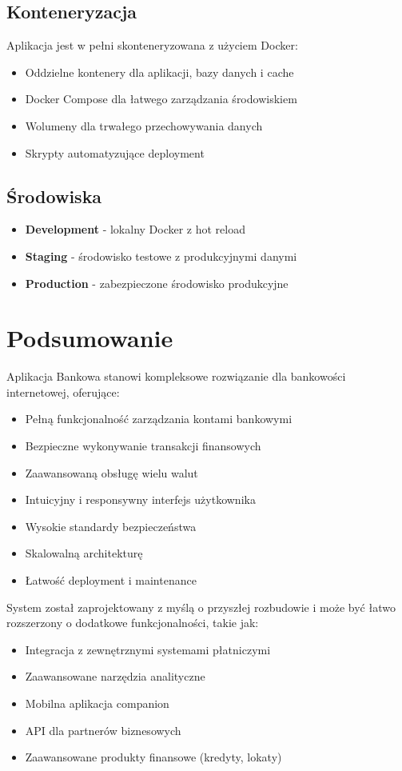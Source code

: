\documentclass[12pt,a4paper]{article}
\begin{document}
    \subsection{Konteneryzacja}
    Aplikacja jest w pełni skonteneryzowana z użyciem Docker:
    \begin{itemize}
        \item Oddzielne kontenery dla aplikacji, bazy danych i cache
        \item Docker Compose dla łatwego zarządzania środowiskiem
        \item Wolumeny dla trwałego przechowywania danych
        \item Skrypty automatyzujące deployment
    \end{itemize}

    \subsection{Środowiska}
    \begin{itemize}
        \item \textbf{Development} - lokalny Docker z hot reload
        \item \textbf{Staging} - środowisko testowe z produkcyjnymi danymi
        \item \textbf{Production} - zabezpieczone środowisko produkcyjne
    \end{itemize}

    \section{Podsumowanie}

    Aplikacja Bankowa stanowi kompleksowe rozwiązanie dla bankowości internetowej, oferujące:

    \begin{itemize}
        \item Pełną funkcjonalność zarządzania kontami bankowymi
        \item Bezpieczne wykonywanie transakcji finansowych
        \item Zaawansowaną obsługę wielu walut
        \item Intuicyjny i responsywny interfejs użytkownika
        \item Wysokie standardy bezpieczeństwa
        \item Skalowalną architekturę
        \item Łatwość deployment i maintenance
    \end{itemize}

    System został zaprojektowany z myślą o przyszłej rozbudowie i może być łatwo rozszerzony o dodatkowe funkcjonalności, takie jak:
    \begin{itemize}
        \item Integracja z zewnętrznymi systemami płatniczymi
        \item Zaawansowane narzędzia analityczne
        \item Mobilna aplikacja companion
        \item API dla partnerów biznesowych
        \item Zaawansowane produkty finansowe (kredyty, lokaty)
    \end{itemize}
\end{document}
